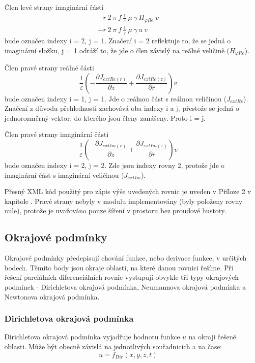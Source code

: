 \documentclass[12pt,a4paper,oneside]{article}
\numberwithin{equation}{section} %
\numberwithin{figure}{section} %
\numberwithin{table}{section} %
\begin{document}
Člen levé strany imaginární části
\begin{subequations}
\begin{gather}
- r ~ 2 ~ \pi ~ f ~ \frac{1}{\varepsilon} ~ \mu ~ \gamma ~ H _{\varphi Re} ~ v
\\
- r ~ 2 ~ \pi ~ f ~ \frac{1}{\varepsilon} ~ \mu ~ \gamma ~ u ~ v
\end{gather}
\end{subequations}
bude označen indexy i = 2, j = 1. Značení i = 2 reflektuje to, že se jedná o imaginární složku, j = 1 odráží to, že jde o člen závislý na reálné veličině ($H _{\varphi Re}$).

Člen pravé strany reálné části
\begin{equation}
\frac{1}{\varepsilon} \left( - \frac{\partial J _{extRe(r)}}{\partial z} + \frac{\partial J _{extRe(z)}}{\partial r} \right) v
\end{equation}
bude označen indexy i = 1, j = 1. Jde o reálnou část s reálnou veličinou ($J _{extRe}$). Značení z důvodu přehlednosti zachovává oba indexy i a j, přestože se jedná o jednorozměrný vektor, do kterého jsou členy zanášeny. Proto i = j.

Člen pravé strany imaginární části
\begin{equation}
\frac{1}{\varepsilon} \left( - \frac{\partial J _{extIm(r)}}{\partial z} + \frac{\partial J _{extIm(z)}}{\partial r} \right)  v
\end{equation}
bude označen indexy i = 2, j = 2. Zde jsou indexy rovny 2, protože jde o imaginární část s imaginární veličinou ($J _{extIm}$).

Přesný XML kód použitý pro zápis výše uvedených rovnic je uveden v Příloze 2 v kapitole . Pravé strany nebyly v modulu implementovány (byly položeny rovny nule), protože je uvažováno pouze šíření v prostoru bez proudové hustoty.


\subsection{Okrajové podmínky}
Okrajové podmínky předepisují chování funkce, nebo derivace funkce, v určitých bodech. Těmito body jsou okraje oblasti, na které danou rovnici řešíme. Při řešení parciálních diferenciálních rovnic vystupují obvykle tři typy okrajových podmínek - Dirichletova okrajová podmínka, Neumannova okrajová podmínka a Newtonova okrajová podmínka.


\subsubsection{Dirichletova okrajová podmínka}
Dirichletova okrajová podmínka vyjadřuje hodnotu funkce $u$ na okraji řešené oblasti. Může být obecně závislá na jednotlivých souřadnicích a na čase: 
\begin{equation}
u = f _{Dir} (x, y, z, t)
\end{equation}
\end{document}
